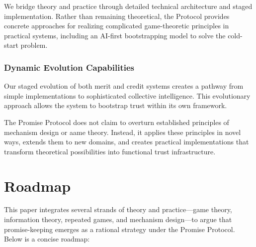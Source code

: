 \documentclass[11pt]{article}
\begin{document}
We bridge theory and practice through detailed technical architecture and staged implementation. Rather than remaining theoretical, the Protocol provides concrete approaches for realizing complicated game-theoretic principles in practical systems, including an AI-first bootstrapping model to solve the cold-start problem.
\subsubsection{Dynamic Evolution Capabilities}
\label{sec:org9b1d455}

Our staged evolution of both merit and credit systems creates a pathway from simple implementations to sophisticated collective intelligence. This evolutionary approach allows the system to bootstrap trust within its own framework.

The Promise Protocol does not claim to overturn established principles of mechanism design or aame theory. Instead, it applies these principles in novel ways, extends them to new domains, and creates practical implementations that transform theoretical possibilities into functional trust infrastructure.
\section{Roadmap}
\label{sec:orgda43a7f}
This paper integrates several strands of theory and practice—game theory, information theory, repeated games, and mechanism design—to argue that promise-keeping emerges as a rational strategy under the Promise Protocol. Below is a concise roadmap:
\end{document}
